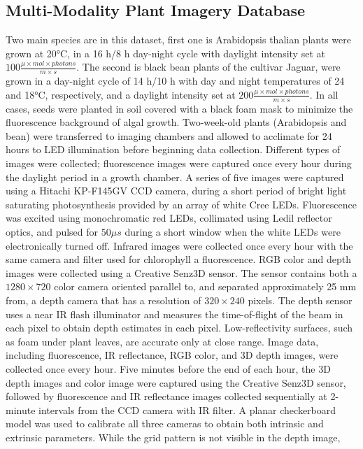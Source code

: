 \subsection{Multi-Modality Plant Imagery Database}
Two main species are in this dataset\cite{cruz2016multi}, first one is Arabidopsis thalian plants were grown at 20°C, in a 16 h/8 h
day-night cycle with daylight intensity set at $100 \frac{\mu \times mol \times photons}{m \times s}$. The second is black bean plants of the cultivar Jaguar, were
grown in a day-night cycle of 14 h/10 h with day and night temperatures of 24 and 18°C, respectively, and a daylight intensity set at
$200 \frac{\mu \times mol \times photons}{m \times s}$. In all cases, seeds were planted in soil covered with a black foam mask to minimize the fluorescence background
of algal growth. Two-week-old plants (Arabidopsis and bean) were transferred to imaging chambers and allowed to acclimate for 24 hours to
LED illumination before beginning data collection. Different types of images were collected; fluorescence images were captured once every
hour during the daylight period in a growth chamber. A series of five images were captured using a Hitachi KP-F145GV CCD camera, during
a short period of bright light saturating photosynthesis provided by an array of white Cree LEDs. Fluorescence was excited using
monochromatic red LEDs, collimated using Ledil reflector optics, and pulsed for $50\mu s$ during a short window when the white LEDs were
electronically turned off. Infrared images were collected once every hour with the same camera and filter used for chlorophyll a fluorescence.
RGB color and depth images were collected using a Creative Senz3D sensor. The sensor contains both a $1280\times 720$ color camera oriented parallel
to, and separated approximately 25 mm from, a depth camera that has a resolution of $320 \times 240$ pixels. The depth sensor uses a near IR flash
illuminator and measures the time-of-flight of the beam in each pixel to obtain depth estimates in each pixel. Low-reflectivity surfaces,
such as foam under plant leaves, are accurate only at close range. Image data, including fluorescence, IR reflectance, RGB color, and 3D depth images, were
collected once every hour. Five minutes before the end of each hour, the 3D depth images and color image were captured using the Creative Senz3D sensor,
followed by fluorescence and IR reflectance images collected sequentially at 2-minute intervals from the CCD camera with IR filter. A planar checkerboard
model was used to calibrate all three cameras to obtain both intrinsic and extrinsic parameters. While the grid pattern is not visible in the depth image,
